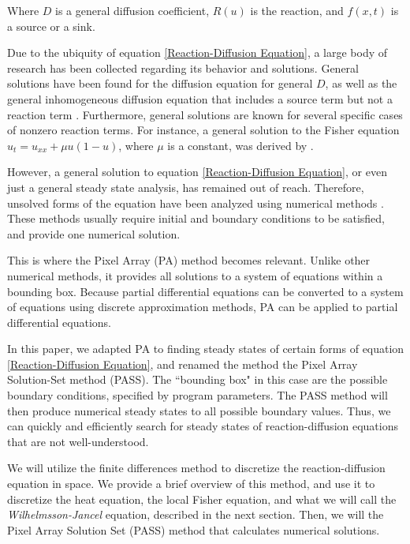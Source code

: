 \documentclass{article}
\begin{document}
\noindent Where $D$ is a general diffusion coefficient, $R(u)$ is the reaction, and $f(x,t)$ is a source or a sink.

Due to the ubiquity of equation \ref{Reaction-Diffusion Equation}, a large body of research has been collected regarding its behavior and solutions. General solutions have been found for the diffusion equation for general $D$, as well as the general inhomogeneous diffusion equation that includes a source term but not a reaction term \citep{Kuttler_lecture}. Furthermore, general solutions are known for several specific cases of nonzero reaction terms. For instance, a general solution to the Fisher equation $u_t = u_{xx} + \mu u(1-u)$, where $\mu$ is a constant, was derived by \citep{AnalyticFisher}.

However, a general solution to equation \ref{Reaction-Diffusion Equation}, or even just a general steady state analysis, has remained out of reach. Therefore, unsolved forms of the equation have been analyzed using numerical methods \citep{Numerical_RD_1, Numerical_RD_2, Numerical_RD_3}. These methods usually require initial and boundary conditions to be satisfied, and provide one numerical solution.

This is where the Pixel Array (PA) method \citep{Introduction_to_PA} becomes relevant. Unlike other numerical methods, it provides all solutions to a system of equations within a bounding box. Because partial differential equations can be converted to a system of equations using discrete approximation methods, PA can be applied to partial differential equations. 

In this paper, we adapted PA to finding steady states of certain forms of equation \ref{Reaction-Diffusion Equation}, and renamed the method the Pixel Array Solution-Set method (PASS). The ``bounding box" in this case are the possible boundary conditions, specified by program parameters. The PASS method will then produce numerical steady states to all possible boundary values. Thus, we can quickly and efficiently search for steady states of reaction-diffusion equations that are not well-understood.

We will utilize the finite differences method to discretize the reaction-diffusion equation in space. We provide a brief overview of this method, and use it to discretize the heat equation, the local Fisher equation, and what we will call the \textit{Wilhelmsson-Jancel} equation, described in the next section. Then, we will the Pixel Array Solution Set (PASS) method that calculates numerical solutions. 
\end{document}

